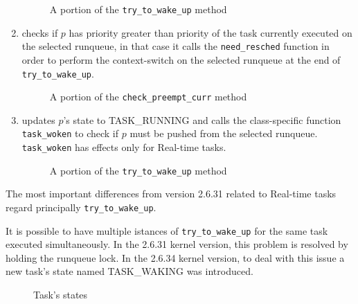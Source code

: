 \begin{enumerate}
\begin{figure}[h]
  \lstset{basicstyle=\footnotesize, language=c, captionpos=b, frame=single,label=lis:check_preempt}
  
  \caption{A portion of the \texttt{try\_to\_wake\_up} method}
  \label{code:check_preempt}
\end{figure}

\item checks if $p$ has priority greater than priority of the task currently
executed on the selected runqueue, in that case it calls the \texttt{need\_resched}
function in order to perform the context-switch on the selected runqueue at the
end of \texttt{try\_to\_wake\_up}.

\begin{figure}[h]
  \lstset{basicstyle=\footnotesize, language=c, captionpos=b, frame=single,label=lis:prio_ttwu}
  
  \caption{A portion of the \texttt{check\_preempt\_curr} method}
  \label{code:prio_ttwu}
\end{figure}

\item updates $p$'s state to TASK\_RUNNING and calls the class-specific function 
\texttt{task\_woken} to check if $p$ must be pushed from the selected runqueue.
\texttt{task\_woken} has effects only for Real-time tasks.

\begin{figure}[h]
  \lstset{basicstyle=\footnotesize, language=c, captionpos=b, frame=single,label=lis:final_ttwu}
  
  \caption{A portion of the \texttt{try\_to\_wake\_up} method}
  \label{code:final_ttwu}
\end{figure}

\end{enumerate}

The most important differences from version 2.6.31 related to Real-time tasks regard principally \texttt{try\_to\_wake\_up}.

It is possible to have multiple istances of \texttt{try\_to\_wake\_up} for the same task executed simultaneously. In the 2.6.31 kernel version, 
this problem is resolved by holding the runqueue lock. In the 2.6.34 kernel version, to deal with this issue a new task's state named TASK\_WAKING 
was introduced.

\begin{figure}[h]
  \lstset{basicstyle=\footnotesize, language=c, captionpos=b, frame=single,label=lis:task_states}
  
  \caption{Task's states}
  \label{code:task_states}
\end{figure}

